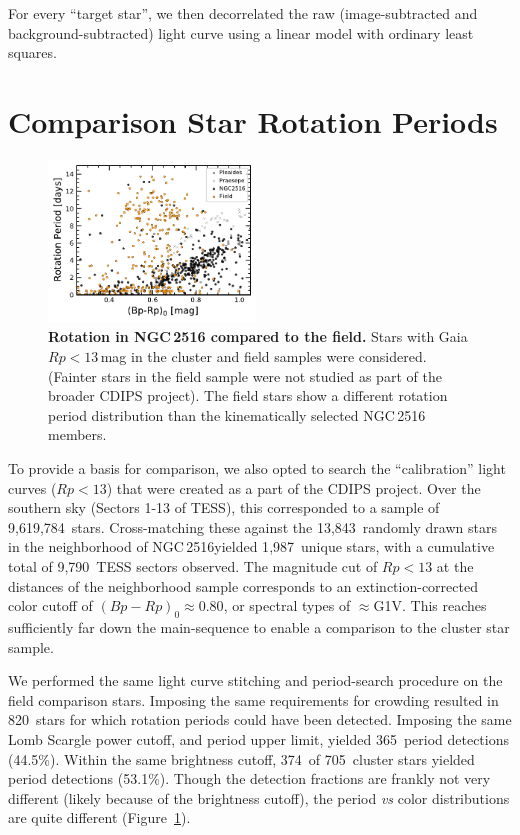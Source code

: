 \documentclass[12pt,twocolumn,tighten]{aastex63}
\newcommand{\cn}{NGC\,2516} %
\newcommand{\nnbhd}{13{,}843\ } %
\newcommand{\ncalibration}{9{,}619{,}784\ } %
\newcommand{\nnbhdcaliblc}{9{,}790\ } %
\newcommand{\nnbhdcalibstar}{1{,}987\ } %
\newcommand{\ncompstardenominator}{820\ } %
\newcommand{\ncompstarnumerator}{365\ } %
\newcommand{\ncompfrac}{44.5\%} %
\newcommand{\nautovscompstardenominator}{705\ } %
\newcommand{\nautovscompstarnumerator}{374\ } %
\newcommand{\nautofrac}{53.1\%} %
\begin{document}
For every ``target star'', we then decorrelated the raw
(image-subtracted and background-subtracted) light curve
using a linear model with ordinary least squares.

\section{Comparison Star Rotation Periods}
\label{app:compstar}

\begin{figure}[t]
	\begin{center}
		\leavevmode
    \includegraphics[width=0.49\textwidth]{f9.pdf}
	\end{center}
	\vspace{-0.7cm}
	\caption{ {\bf Rotation in NGC\,2516 compared to the field.}
  Stars with Gaia $Rp<13$\,mag in the cluster and field samples were
  considered. (Fainter stars in the field sample were not studied as part
  of the broader CDIPS project).
  The field stars show a different rotation period distribution than
  the kinematically selected NGC\,2516 members.
  \label{fig:compstar}
	}
\end{figure}

To provide a basis for comparison, we also opted to search the
``calibration'' light curves ($Rp<13$) that were created as a part of
the CDIPS project.  Over the southern sky (Sectors 1-13 of TESS), this
corresponded to a sample of \ncalibration stars.  Cross-matching these
against the \nnbhd randomly drawn stars in the neighborhood of \cn yielded
\nnbhdcalibstar unique stars, with a cumulative total of \nnbhdcaliblc TESS
sectors observed.
The magnitude cut of $Rp<13$ at the distances of the neighborhood sample
corresponds to an extinction-corrected color cutoff of $(Bp-Rp)_0
\approx 0.80$, or spectral types of $\approx$G1V.
This reaches sufficiently far down the main-sequence to enable a
comparison to the cluster star sample.

We performed the same light curve stitching and period-search
procedure on the field comparison stars.
Imposing the same requirements for crowding resulted in
\ncompstardenominator stars for which rotation periods could have been
detected.
Imposing the same Lomb Scargle power cutoff, and period upper limit,
yielded \ncompstarnumerator period detections (\ncompfrac).
Within the same brightness cutoff, 
\nautovscompstarnumerator of \nautovscompstardenominator cluster stars
yielded period detections (\nautofrac).
Though the detection fractions are frankly not very different
(likely because of the brightness cutoff), the period {\it
vs} color distributions are quite different
(Figure~\ref{fig:compstar}).
\end{document}
